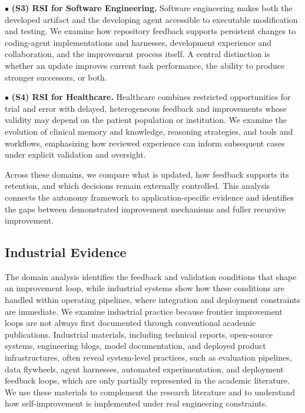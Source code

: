 \noindent$\bullet$ \textbf{(S3) RSI for Software Engineering.}
Software engineering makes both the developed artifact and the developing agent accessible to executable modification and testing. We examine how repository feedback supports persistent changes to coding-agent implementations and harnesses, development experience and collaboration, and the improvement process itself. A central distinction is whether an update improves current task performance, the ability to produce stronger successors, or both.

\noindent$\bullet$ \textbf{(S4) RSI for Healthcare.}
Healthcare combines restricted opportunities for trial and error with delayed, heterogeneous feedback and improvements whose validity may depend on the patient population or institution. We examine the evolution of clinical memory and knowledge, reasoning strategies, and tools and workflows, emphasizing how reviewed experience can inform subsequent cases under explicit validation and oversight.

Across these domains, we compare what is updated, how feedback supports its retention, and which decisions remain externally controlled. This analysis connects the autonomy framework to application-specific evidence and identifies the gaps between demonstrated improvement mechanisms and fuller recursive improvement.







\subsection{Industrial Evidence}

The domain analysis identifies the feedback and validation conditions that shape an improvement loop, while industrial systems show how these conditions are handled within operating pipelines, where integration and deployment constraints are immediate. We examine industrial practice because frontier improvement loops are not always first documented through conventional academic publications. Industrial materials, including technical reports, open-source systems, engineering blogs, model documentation, and deployed product infrastructures, often reveal system-level practices, such as evaluation pipelines, data flywheels, agent harnesses, automated experimentation, and deployment feedback loops, which are only partially represented in the academic literature. We use these materials to complement the research literature and to understand how self-improvement is implemented under real engineering constraints.

